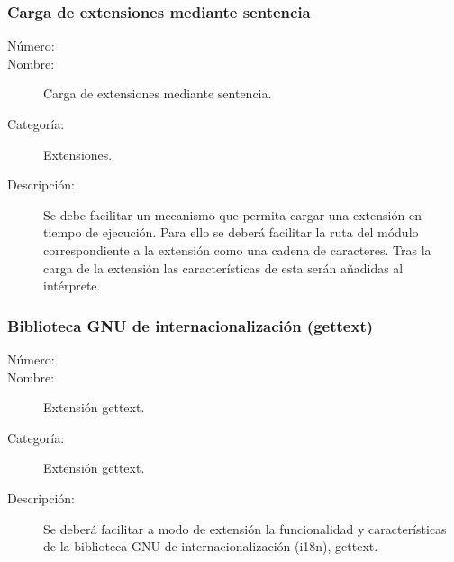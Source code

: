 \subsubsection{Carga de extensiones mediante sentencia}
\begin{framed}
	\begin{description}
		\item [Número:] \cn
		\item [Nombre:] Carga de extensiones mediante sentencia.
		\item [Categoría:] Extensiones.
		\item [Descripción:] Se debe facilitar un mecanismo que permita cargar una extensión en tiempo de ejecución. Para ello se deberá
      facilitar la ruta del módulo correspondiente a la extensión como una cadena de caracteres. Tras la carga de la extensión las 
      características de esta serán añadidas al intérprete.
	\end{description}
\end{framed}

\subsubsection{Biblioteca GNU de internacionalización (gettext)}
\begin{framed}
	\begin{description}
		\item [Número:] \cn
		\item [Nombre:] Extensión gettext.
		\item [Categoría:] Extensión gettext.
		\item [Descripción:] Se deberá facilitar a modo de extensión la funcionalidad y características de la 
      biblioteca GNU de internacionalización (i18n), gettext. 
	\end{description}
\end{framed}
